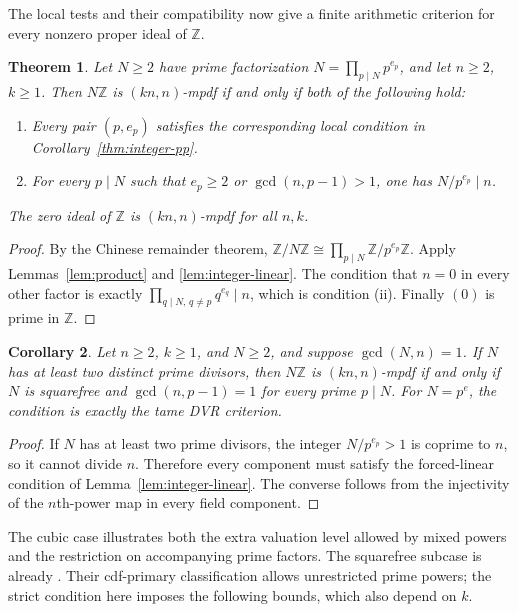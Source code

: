 \documentclass[11pt,a4paper]{amsart}
\newtheorem{theorem}{Theorem}[section]
\newtheorem{corollary}[theorem]{Corollary}
\theoremstyle{definition}
\theoremstyle{remark}
\numberwithin{equation}{section}
\begin{document}
The local tests and their compatibility now give a finite arithmetic
criterion for every nonzero proper ideal of $\mathbb Z$.

\begin{theorem}\label{thm:integer-all}
Let $N\ge2$ have prime factorization $N=\prod_{p\mid N}p^{e_p}$,
and let $n\ge2$, $k\ge1$.
Then $N\mathbb Z$ is $(kn,n)$-mpdf if and only if both of the following
hold:
\begin{enumerate}
\item Every pair $(p,e_p)$ satisfies the corresponding local condition
      in Corollary~\ref{thm:integer-pp}.
\item For every $p\mid N$ such that
      $e_p\ge2$ or $\gcd(n,p-1)>1$, one has
      $N/p^{e_p}\mid n$.
\end{enumerate}
The zero ideal of $\mathbb Z$ is $(kn,n)$-mpdf for all $n,k$.
\end{theorem}
\begin{proof}
By the Chinese remainder theorem,
$\mathbb Z/N\mathbb Z\cong\prod_{p\mid N}\mathbb Z/p^{e_p}\mathbb Z$.
Apply Lemmas~\ref{lem:product} and \ref{lem:integer-linear}.
The condition that $n=0$ in every other factor is exactly
$\prod_{q\mid N,\,q\ne p}q^{e_q}\mid n$, which is condition (ii).
Finally $(0)$ is prime in $\mathbb Z$.
\end{proof}

\begin{corollary}
Let $n\ge2$, $k\ge1$, and $N\ge2$, and suppose $\gcd(N,n)=1$. If $N$ has at least two distinct
prime divisors, then $N\mathbb Z$ is $(kn,n)$-mpdf if and only if $N$
is squarefree and $\gcd(n,p-1)=1$ for every prime $p\mid N$.
For $N=p^e$, the condition is exactly the tame DVR criterion.
\end{corollary}
\begin{proof}
If $N$ has at least two prime divisors, the integer $N/p^{e_p}>1$ is
coprime to $n$, so it cannot divide $n$. Therefore every component
must satisfy the forced-linear condition of Lemma~\ref{lem:integer-linear}.
The converse follows from the injectivity of the $n$th-power map in
every field component.
\end{proof}


The cubic case illustrates both the extra valuation level allowed by mixed
powers and the restriction on accompanying prime factors.
The squarefree subcase is already \cite[Theorem~5]{YSO}.
Their cdf-primary classification \cite[Theorem~6]{YSO} allows
unrestricted prime powers; the strict condition here imposes the
following bounds, which also depend on $k$.
\end{document}
